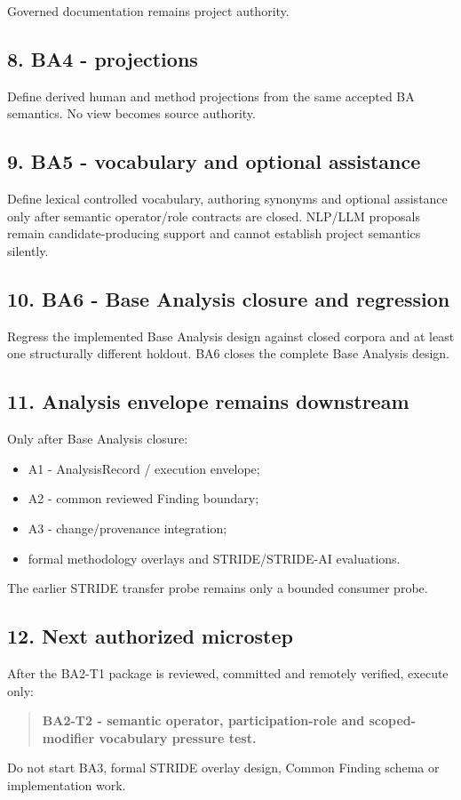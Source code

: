 \documentclass[
  10pt,
  letterpaper,
]{article}
\providecommand{\tightlist}{%
  \setlength{\itemsep}{0pt}\setlength{\parskip}{0pt}}
\begin{document}
Governed documentation remains project authority.

\subsection{8. BA4 - projections}\label{ba4---projections}

Define derived human and method projections from the same accepted BA
semantics. No view becomes source authority.

\subsection{9. BA5 - vocabulary and optional
assistance}\label{ba5---vocabulary-and-optional-assistance}

Define lexical controlled vocabulary, authoring synonyms and optional
assistance only after semantic operator/role contracts are closed.
NLP/LLM proposals remain candidate-producing support and cannot
establish project semantics silently.

\subsection{10. BA6 - Base Analysis closure and
regression}\label{ba6---base-analysis-closure-and-regression}

Regress the implemented Base Analysis design against closed corpora and
at least one structurally different holdout. BA6 closes the complete
Base Analysis design.

\subsection{11. Analysis envelope remains
downstream}\label{analysis-envelope-remains-downstream}

Only after Base Analysis closure:

\begin{itemize}
\tightlist
\item
  A1 - AnalysisRecord / execution envelope;
\item
  A2 - common reviewed Finding boundary;
\item
  A3 - change/provenance integration;
\item
  formal methodology overlays and STRIDE/STRIDE-AI evaluations.
\end{itemize}

The earlier STRIDE transfer probe remains only a bounded consumer probe.

\subsection{12. Next authorized
microstep}\label{next-authorized-microstep}

After the BA2-T1 package is reviewed, committed and remotely verified,
execute only:

\begin{quote}
\textbf{BA2-T2 - semantic operator, participation-role and
scoped-modifier vocabulary pressure test.}
\end{quote}

Do not start BA3, formal STRIDE overlay design, Common Finding schema or
implementation work.
\end{document}

